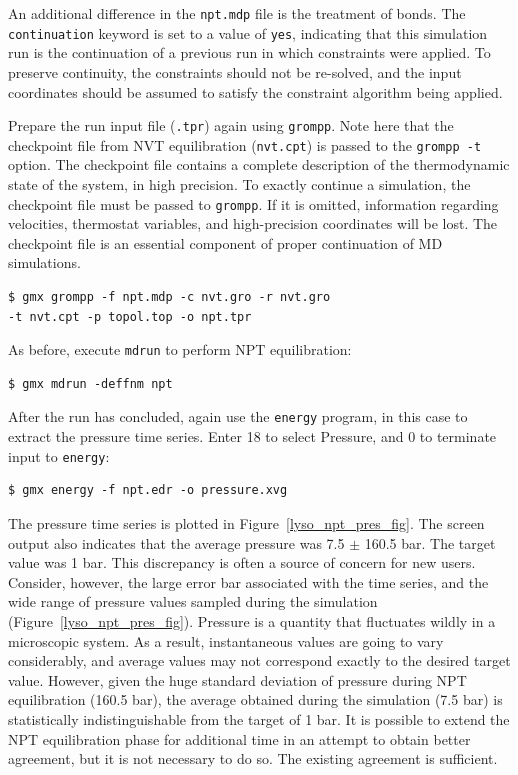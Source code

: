 \documentclass[9pt,tutorial]{livecoms}
\begin{document}
An additional difference in the \texttt{npt.mdp} file is the treatment of bonds. The \texttt{continuation} keyword is set to a value of \texttt{yes}, indicating that this simulation run is the continuation of a previous run in which constraints were applied. To preserve continuity, the constraints should not be re-solved, and the input coordinates should be assumed to satisfy the constraint algorithm being applied.

Prepare the run input file (\texttt{.tpr}) again using \texttt{grompp}. Note here that the checkpoint file from NVT equilibration (\texttt{nvt.cpt}) is passed to the \texttt{grompp -t} option. The checkpoint file contains a complete description of the thermodynamic state of the system, in high precision. To exactly continue a simulation, the checkpoint file must be passed to \texttt{grompp}. If it is omitted, information regarding velocities, thermostat variables, and high-precision coordinates will be lost. The checkpoint file is an essential component of proper continuation of MD simulations.

\begin{verbatim}
$ gmx grompp -f npt.mdp -c nvt.gro -r nvt.gro 
-t nvt.cpt -p topol.top -o npt.tpr
\end{verbatim}

As before, execute \texttt{mdrun} to perform NPT equilibration:

\begin{verbatim}
$ gmx mdrun -deffnm npt
\end{verbatim}

After the run has concluded, again use the \texttt{energy} program, in this case to extract the pressure time series. Enter 18 to select Pressure, and 0 to terminate input to \texttt{energy}:

\begin{verbatim}
$ gmx energy -f npt.edr -o pressure.xvg
\end{verbatim}

The pressure time series is plotted in Figure~\ref{lyso_npt_pres_fig}. The screen output also indicates that the average pressure was 7.5 $\pm$ 160.5 bar. The target value was 1 bar. This discrepancy is often a source of concern for new users. Consider, however, the large error bar associated with the time series, and the wide range of pressure values sampled during the simulation (Figure~\ref{lyso_npt_pres_fig}). Pressure is a quantity that fluctuates wildly in a microscopic system. As a result, instantaneous values are going to vary considerably, and average values may not correspond exactly to the desired target value. However, given the huge standard deviation of pressure during NPT equilibration (160.5 bar), the average obtained during the simulation (7.5 bar) is statistically indistinguishable from the target of 1 bar. It is possible to extend the NPT equilibration phase for additional time in an attempt to obtain better agreement, but it is not necessary to do so. The existing agreement is sufficient.
\end{document}
